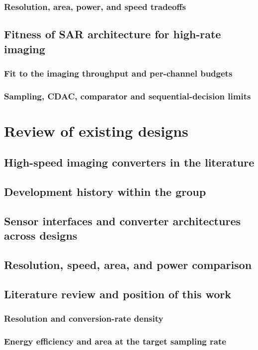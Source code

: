 \documentclass[PhD, UKenglish]{scrbook}
\begin{document}
\subsubsection{Resolution, area, power, and speed tradeoffs}
\subsection{Fitness of SAR architecture for high-rate imaging}
\subsubsection{Fit to the imaging throughput and per-channel budgets}
\subsubsection{Sampling, CDAC, comparator and sequential-decision limits}
\clearpage

\section{Review of existing designs}
\subsection{High-speed imaging converters in the literature}
\subsection{Development history within the group}
\subsection{Sensor interfaces and converter architectures across designs}
\subsection{Resolution, speed, area, and power comparison}
\subsection{Literature review and position of this work}
\subsubsection{Resolution and conversion-rate density}
\subsubsection{Energy efficiency and area at the target sampling rate}
\end{document}
